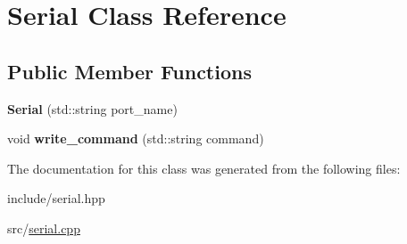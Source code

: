 \hypertarget{classSerial}{}\section{Serial Class Reference}
\label{classSerial}
\subsection*{Public Member Functions}
\begin{DoxyCompactItemize}
\item 
{\bfseries Serial} (std\+::string port\+\_\+name)\hypertarget{classSerial_a9c4cb307f3b68213d98bc71636c1ea5c}{}\label{classSerial_a9c4cb307f3b68213d98bc71636c1ea5c}

\item 
void {\bfseries write\+\_\+command} (std\+::string command)\hypertarget{classSerial_acbf8f4424b3f1215bec7b6c2877511ac}{}\label{classSerial_acbf8f4424b3f1215bec7b6c2877511ac}

\end{DoxyCompactItemize}


The documentation for this class was generated from the following files\+:\begin{DoxyCompactItemize}
\item 
include/serial.\+hpp\item 
src/\hyperlink{serial_8cpp}{serial.\+cpp}\end{DoxyCompactItemize}
